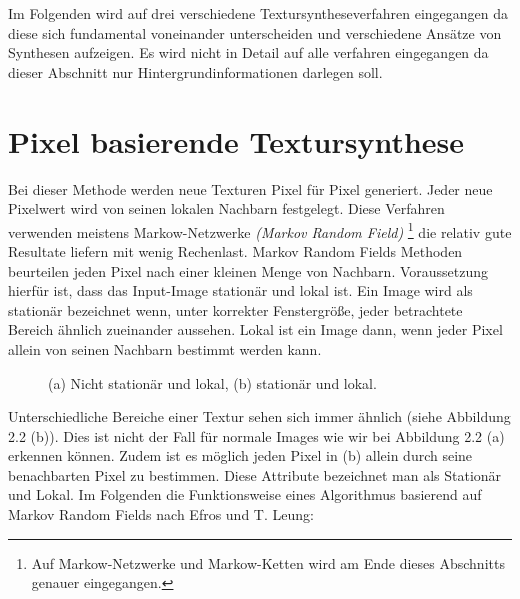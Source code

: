 \documentclass[12pt, a4paper,twoside,openright]{report} %
\begin{document}
Im Folgenden wird auf drei verschiedene Textursyntheseverfahren eingegangen da diese sich fundamental voneinander unterscheiden und verschiedene Ansätze von Synthesen aufzeigen.
Es wird nicht in Detail auf alle verfahren eingegangen da dieser Abschnitt nur Hintergrundinformationen darlegen soll.

\section{Pixel basierende Textursynthese}

Bei dieser Methode werden neue Texturen Pixel für Pixel generiert.
Jeder neue Pixelwert wird von seinen lokalen Nachbarn festgelegt.
Diese Verfahren verwenden meistens Markow-Netzwerke \textit{(Markov Random Field)}
\footnote[1]{Auf Markow-Netzwerke und Markow-Ketten wird am Ende dieses Abschnitts genauer eingegangen.}
die relativ gute Resultate liefern mit wenig Rechenlast.
Markov Random Fields Methoden beurteilen jeden Pixel nach einer kleinen Menge von Nachbarn.
Voraussetzung hierfür ist, dass das Input-Image stationär und lokal ist.
Ein Image wird als stationär bezeichnet wenn, unter korrekter Fenstergröße,
jeder betrachtete Bereich ähnlich zueinander aussehen.
Lokal ist ein Image dann, wenn jeder Pixel allein von seinen Nachbarn bestimmt werden kann. \cite{GomathiShah2009}

\begin{figure}[H]
    \centering
    \qquad
    \caption{(a) Nicht stationär und lokal, (b) stationär und lokal.}%
\end{figure}

Unterschiedliche Bereiche einer Textur sehen sich immer ähnlich {(siehe Abbildung 2.2 (b))}.
Dies ist nicht der Fall für normale Images wie wir bei Abbildung 2.2 {(a)} erkennen können.
Zudem ist es möglich jeden Pixel in {(b)} allein durch seine benachbarten Pixel zu bestimmen.
Diese Attribute bezeichnet man als Stationär und Lokal. \cite{GomathiShah2009}
Im Folgenden die Funktionsweise eines Algorithmus basierend auf Markov Random Fields nach Efros und T. Leung: \cite{Efros99}
\end{document}

